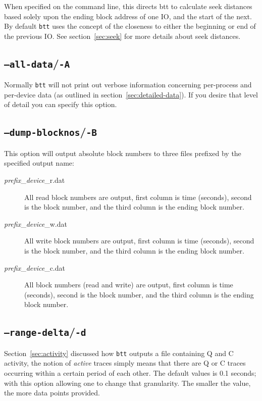 \documentclass{article}
\begin{document}
  When specified on the command line, this directs btt to calculate
  seek distances based solely upon the ending block address of one IO,
  and the start of the next.  By default \texttt{btt} uses the concept
  of the closeness to either the beginning or end of the previous IO. See
  section~\ref{sec:seek} for more details about seek distances.

\subsection{\label{sec:o-A}\texttt{--all-data}/\texttt{-A}}

  Normally \texttt{btt} will not print out verbose information
  concerning per-process and per-device data (as outlined in
  section~\ref{sec:detailed-data}). If you desire that level of
  detail you can specify this option.

\subsection{\label{sec:o-B}\texttt{--dump-blocknos}/\texttt{-B}}

  This option will output absolute block numbers to three files prefixed
  by the specified output name:

  \begin{description}
    \item[\emph{prefix}\_\emph{device}\_r.dat] All read block numbers are
    output, first column is time (seconds), second is the block number,
    and the third column is the ending block number.

    \item[\emph{prefix}\_\emph{device}\_w.dat] All write block numbers are
    output, first column is time (seconds), second is the block number,
    and the third column is the ending block number.

    \item[\emph{prefix}\_\emph{device}\_c.dat] All block numbers (read
    and write) are output, first column is time (seconds), second is
    the block number, and the third column is the ending block number.
  \end{description}

\subsection{\label{sec:o-d}\texttt{--range-delta}/\texttt{-d}}

  Section~\ref{sec:activity} discussed how \texttt{btt} outputs a file
  containing Q and C activity, the notion of \emph{active} traces simply
  means that there are Q or C traces occurring within a certain period
  of each other. The default values is 0.1 seconds; with this option
  allowing one to change that granularity. The smaller the value, the
  more data points provided.
\end{document}
